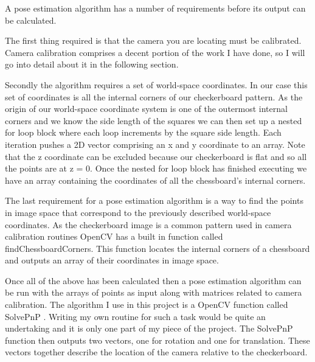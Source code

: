 \documentclass{article}
\begin{document}

A pose estimation algorithm has a number of requirements before its output can be calculated. \par

The first thing required is that the camera you are locating must be calibrated. Camera calibration comprises a decent portion of the work I have done, so I will go into detail about it in the following section. \par

Secondly the algorithm requires a set of world-space coordinates. In our case this set of coordinates is all the internal corners of our checkerboard pattern. As the origin of our world-space coordinate system is one of the outermost internal corners and we know the side length of the squares we can then set up a nested for loop block where each loop increments by the square side length. Each iteration pushes a 2D vector comprising an x and y coordinate to an array. Note that the z coordinate can be excluded because our checkerboard is flat and so all the points are at z = 0. Once the nested for loop block has finished executing we have an array containing the coordinates of all the chessboard's internal corners. \par

The last requirement for a pose estimation algorithm is a way to find the points in image space that correspond to the previously described world-space coordinates. As the checkerboard image is a common pattern used in camera calibration routines OpenCV has a built in function called findChessboardCorners. This function locates the internal corners of a chessboard and outputs an array of their coordinates in image space. \par

Once all of the above has been calculated then a pose estimation algorithm can be run with the arrays of points as input along with matrices related to camera calibration. The algorithm I use in this project is a OpenCV function called SolvePnP \cite{calib3}. Writing my own routine for such a task would be quite an undertaking and it is only one part of my piece of the project. The SolvePnP function then outputs two vectors, one for rotation and one for translation. These vectors together describe the location of the camera relative to the checkerboard. \par
\end{document}
